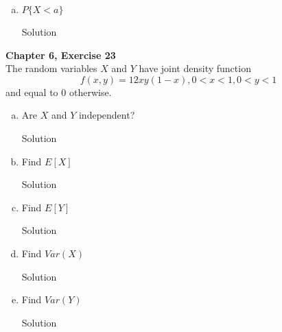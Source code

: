 \documentclass{article}
\begin{document}
\begin{spacing}{1.1}
\begin{homeworkProblem}
\begin{enumerate}[(a)]
\begin{homeworkSection}{Solution}
      \end{homeworkSection}
    \item $P\{ X < a\}$
      \begin{homeworkSection}{Solution}
        
      \end{homeworkSection}
  \end{enumerate}
\end{homeworkProblem}

\newpage
\begin{homeworkProblem}
  {\bf Chapter 6, Exercise 23}\\
  The random variables $X$ and $Y$ have joint density function
  \[f( x, y) = 12 x y (1 - x), 0 < x < 1, 0 < y < 1\]
  and equal to 0 otherwise.
  \begin{enumerate}[(a)]
    \item Are $X$ and $Y$ independent?
      \begin{homeworkSection}{Solution}
        
      \end{homeworkSection}
    \item Find $E[ X]$
      \begin{homeworkSection}{Solution}
        
      \end{homeworkSection}
    \item Find $E[ Y]$
      \begin{homeworkSection}{Solution}
        
      \end{homeworkSection}
    \item Find $Var( X)$
      \begin{homeworkSection}{Solution}
        
      \end{homeworkSection}
    \item Find $Var( Y)$
      \begin{homeworkSection}{Solution}
        
      \end{homeworkSection}
  \end{enumerate}
\end{homeworkProblem}


\end{spacing}
\end{document}
